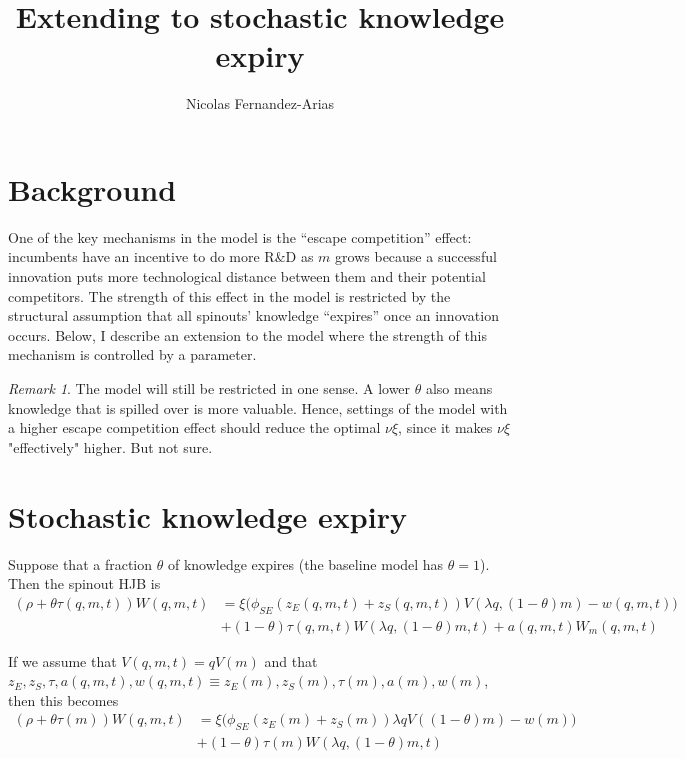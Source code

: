 \documentclass[11pt,english]{article}
\theoremstyle{remark}
\newtheorem*{remark}{Remark}
\begin{document}
	
\title{Extending to stochastic knowledge expiry}
\author{Nicolas Fernandez-Arias}
\maketitle

\section{Background}

One of the key mechanisms in the model is the ``escape competition'' effect: incumbents have an incentive to do more R\&D as $m$ grows because a successful innovation puts more technological distance between them and their potential competitors. The strength of this effect in the model is restricted by the structural assumption that all spinouts' knowledge ``expires'' once an innovation occurs. Below, I describe an extension to the model where the strength of this mechanism is controlled by a parameter. 

\begin{remark}
	The model will still be restricted in one sense. A lower $\theta$ also means knowledge that is spilled over is more valuable. Hence, settings of the model with a higher escape competition effect should reduce the optimal $\nu \xi$, since it makes $\nu \xi$ "effectively" higher. But not sure. 
\end{remark}

\section{Stochastic knowledge expiry}

Suppose that a fraction $\theta$ of knowledge expires (the baseline model has $\theta =1$). Then the spinout HJB is
\begin{align*}
	(\rho + \theta \tau(q,m,t)) W(q,m,t) &= \xi \Big(\phi_{SE}(z_E(q,m,t) + z_S(q,m,t)) V(\lambda q, (1-\theta)m) - w(q,m,t) \Big) \\
	                                      &+  (1-\theta) \tau(q,m,t) W(\lambda q, (1-\theta)m,t) + a(q,m,t) W_m(q,m,t)
\end{align*}

If we assume that $V(q,m,t) = qV(m)$ and that \newline $z_E,z_S,\tau,a(q,m,t),w(q,m,t) \equiv z_E(m),z_S(m),\tau(m),a(m),w(m)$, then this becomes
\begin{align*}
	(\rho + \theta \tau(m)) W(q,m,t) &= \xi \Big( \phi_{SE}(z_E(m) + z_S(m)) \lambda q V((1-\theta)m) - w(m) \Big) \\
										  &+  (1-\theta) \tau(m) W(\lambda q, (1-\theta)m,t)	
\end{align*}
\end{document}
